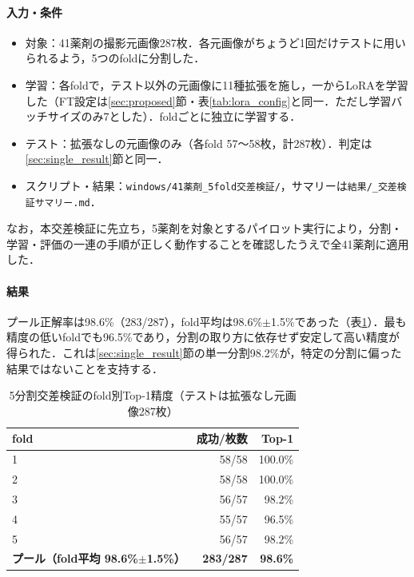 \documentclass[dvipdfmx]{jsarticle}
\begin{document}
\paragraph{入力・条件}
\begin{itemize}
  \item 対象：41薬剤の撮影元画像287枚．各元画像がちょうど1回だけテストに用いられるよう，5つのfoldに分割した．
  \item 学習：各foldで，テスト以外の元画像に11種拡張を施し，一からLoRAを学習した（FT設定は\ref{sec:proposed}節・表\ref{tab:lora_config}と同一．ただし学習バッチサイズのみ7とした）．foldごとに独立に学習する．
  \item テスト：拡張なしの元画像のみ（各fold 57〜58枚，計287枚）．判定は\ref{sec:single_result}節と同一．
  \item スクリプト・結果：\texttt{windows/41薬剤\_5fold交差検証/}，サマリーは\texttt{結果/\_交差検証サマリー.md}．
\end{itemize}

なお，本交差検証に先立ち，5薬剤を対象とするパイロット実行により，分割・学習・評価の一連の手順が正しく動作することを確認したうえで全41薬剤に適用した．

\paragraph{結果}
プール正解率は98.6\%（283/287），fold平均は98.6\%$\pm$1.5\%であった（表\ref{tab:cv}）．最も精度の低いfoldでも96.5\%であり，分割の取り方に依存せず安定して高い精度が得られた．これは\ref{sec:single_result}節の単一分割98.2\%が，特定の分割に偏った結果ではないことを支持する．

\begin{table}[htbp]
\centering
\caption{5分割交差検証のfold別Top-1精度（テストは拡張なし元画像287枚）}
\label{tab:cv}
\begin{tabular}{lrr}
\hline
fold & 成功/枚数 & Top-1 \\
\hline
1 & 58/58 & 100.0\% \\
2 & 58/58 & 100.0\% \\
3 & 56/57 & 98.2\% \\
4 & 55/57 & 96.5\% \\
5 & 56/57 & 98.2\% \\
\hline
\textbf{プール（fold平均 98.6\%$\pm$1.5\%）} & \textbf{283/287} & \textbf{98.6\%} \\
\hline
\end{tabular}
\end{table}
\end{document}

